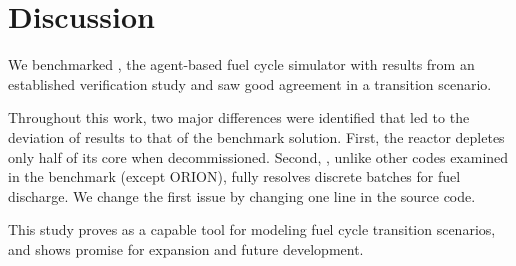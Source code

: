 \section{Discussion}

We benchmarked \Cyclus, the agent-based
fuel cycle simulator with results from an established
verification study and saw good agreement
in a transition scenario.

Throughout this work, two major differences were identified
that led to the deviation
of \Cyclus results to that of the benchmark solution. First,
the \Cycamore reactor depletes only half of its core
when decommissioned. Second, \Cyclus, unlike other
codes examined in the benchmark (except ORION), fully resolves
discrete batches for fuel discharge.
We change the first issue by changing one line in the source code.

This study proves \Cyclus as a capable tool for modeling
fuel cycle transition scenarios, and shows promise for
expansion and future development.
